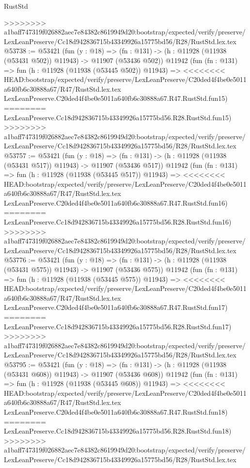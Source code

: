 \begin{lexlean}{RustStd}
\begin{coremodule}
{\begin{coremodule}
{{{{{{{{{{{{{{{{{{{{{{{{{{{{{{{{{{{{{{{{{{{{{{{{{{{{{{{{{{{{{{{{{{{{{{{{{{{{{{{{>>>>>>>> a1baff747319f026882aec7e84382c8619949d20:bootstrap/expected/verify/preserve/LexLeanPreserve/Cc18d942836715b43349926a15775bd56/R28/RustStd.lex.tex
@53738 := @53421
    (fun (y : @18) =>
    (fn : @131) -> (h : @11928 (@11938 (@53431 @502)) @11943) -> @11907 (@53436 @502))
    @11942
    (fun (fn : @131) =>
    fun (h : @11928 (@11938 (@53445 @502)) @11943) =>
<<<<<<<< HEAD:bootstrap/expected/verify/preserve/LexLeanPreserve/C20ded4f4be0e5011a640fb6c30888a67/R47/RustStd.lex.tex
    LexLeanPreserve.C20ded4f4be0e5011a640fb6c30888a67.R47.RustStd.fun15)
========
    LexLeanPreserve.Cc18d942836715b43349926a15775bd56.R28.RustStd.fun15)
>>>>>>>> a1baff747319f026882aec7e84382c8619949d20:bootstrap/expected/verify/preserve/LexLeanPreserve/Cc18d942836715b43349926a15775bd56/R28/RustStd.lex.tex
@53757 := @53421
    (fun (y : @18) =>
    (fn : @131) -> (h : @11928 (@11938 (@53431 @517)) @11943) -> @11907 (@53436 @517))
    @11942
    (fun (fn : @131) =>
    fun (h : @11928 (@11938 (@53445 @517)) @11943) =>
<<<<<<<< HEAD:bootstrap/expected/verify/preserve/LexLeanPreserve/C20ded4f4be0e5011a640fb6c30888a67/R47/RustStd.lex.tex
    LexLeanPreserve.C20ded4f4be0e5011a640fb6c30888a67.R47.RustStd.fun16)
========
    LexLeanPreserve.Cc18d942836715b43349926a15775bd56.R28.RustStd.fun16)
>>>>>>>> a1baff747319f026882aec7e84382c8619949d20:bootstrap/expected/verify/preserve/LexLeanPreserve/Cc18d942836715b43349926a15775bd56/R28/RustStd.lex.tex
@53776 := @53421
    (fun (y : @18) =>
    (fn : @131) -> (h : @11928 (@11938 (@53431 @575)) @11943) -> @11907 (@53436 @575))
    @11942
    (fun (fn : @131) =>
    fun (h : @11928 (@11938 (@53445 @575)) @11943) =>
<<<<<<<< HEAD:bootstrap/expected/verify/preserve/LexLeanPreserve/C20ded4f4be0e5011a640fb6c30888a67/R47/RustStd.lex.tex
    LexLeanPreserve.C20ded4f4be0e5011a640fb6c30888a67.R47.RustStd.fun17)
========
    LexLeanPreserve.Cc18d942836715b43349926a15775bd56.R28.RustStd.fun17)
>>>>>>>> a1baff747319f026882aec7e84382c8619949d20:bootstrap/expected/verify/preserve/LexLeanPreserve/Cc18d942836715b43349926a15775bd56/R28/RustStd.lex.tex
@53795 := @53421
    (fun (y : @18) =>
    (fn : @131) -> (h : @11928 (@11938 (@53431 @608)) @11943) -> @11907 (@53436 @608))
    @11942
    (fun (fn : @131) =>
    fun (h : @11928 (@11938 (@53445 @608)) @11943) =>
<<<<<<<< HEAD:bootstrap/expected/verify/preserve/LexLeanPreserve/C20ded4f4be0e5011a640fb6c30888a67/R47/RustStd.lex.tex
    LexLeanPreserve.C20ded4f4be0e5011a640fb6c30888a67.R47.RustStd.fun18)
========
    LexLeanPreserve.Cc18d942836715b43349926a15775bd56.R28.RustStd.fun18)
>>>>>>>> a1baff747319f026882aec7e84382c8619949d20:bootstrap/expected/verify/preserve/LexLeanPreserve/Cc18d942836715b43349926a15775bd56/R28/RustStd.lex.tex
}}}}}}}}}}}}}}}}}}}}}}}}}}}}}}}}}}}}}}}}}}}}}}}}}}}}}}}}}}}}}}}}}}}}}}}}}}}}}}}}
\end{coremodule}}
\end{coremodule}
\end{lexlean}
